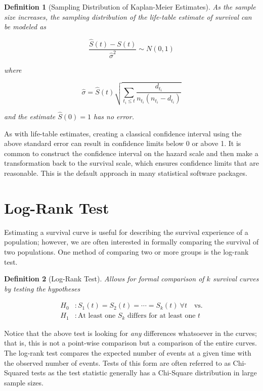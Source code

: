 \documentclass[
]{book}
\theoremstyle{plain}
\theoremstyle{mydefn}
\newtheorem{definition}{Definition}[chapter]
\theoremstyle{myexmpl}
\theoremstyle{remark}
\begin{document}
\begin{definition}[Sampling Distribution of Kaplan-Meier Estimates]
\protect\hypertarget{def:defn-samp-distn-km}{}{\label{def:defn-samp-distn-km} {} }As the sample size increases, the sampling distribution of the life-table estimate of survival can be modeled as

\[\frac{\widehat{S}(t) - S(t)}{\widehat{\sigma}^2} \sim N(0, 1)\]

where

\[\widehat{\sigma} = \widehat{S}(t) \sqrt{\sum\limits_{t_i \leq t} \frac{d_{t_i}}{n_{t_i} \left(n_{t_i} - d_{t_i}\right)}}\]

and the estimate \(\widehat{S}(0) = 1\) has no error.
\end{definition}

As with life-table estimates, creating a classical confidence interval using the above standard error can result in confidence limits below 0 or above 1. It is common to construct the confidence interval on the hazard scale and then make a transformation back to the survival scale, which ensures confidence limits that are reasonable. This is the default approach in many statistical software packages.

\hypertarget{log-rank-test}{%
\section{Log-Rank Test}\label{log-rank-test}}

Estimating a survival curve is useful for describing the survival experience of a population; however, we are often interested in formally comparing the survival of two populations. One method of comparing two or more groups is the log-rank test.

\begin{definition}[Log-Rank Test]
\protect\hypertarget{def:defn-log-rank}{}{\label{def:defn-log-rank} {} }Allows for formal comparison of \(k\) survival curves by testing the hypotheses

\[
\begin{aligned}
  H_0&: S_1(t) = S_2(t) = \dotsb = S_k(t) \ \forall t \quad \text{vs.} \\
  H_1&: \text{At least one } S_k \text{ differs for at least one } t
\end{aligned}
\]
\end{definition}

Notice that the above test is looking for \emph{any} differences whatsoever in the curves; that is, this is not a point-wise comparison but a comparison of the entire curves. The log-rank test compares the expected number of events at a given time with the observed number of events. Tests of this form are often referred to as Chi-Squared tests as the test statistic generally has a Chi-Square distribution in large sample sizes.
\end{document}
